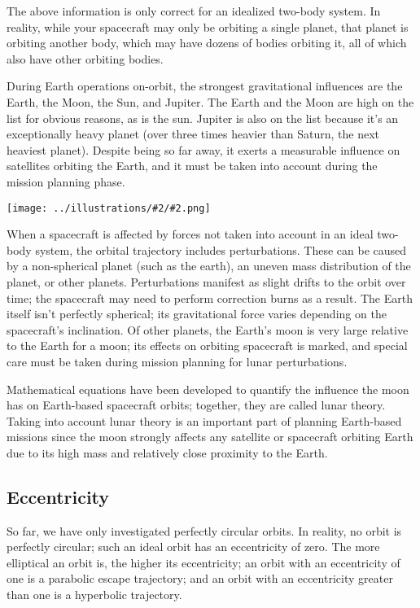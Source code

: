 \documentclass[oneside,a5paper]{book}
\newcommand{\widthillustration}[2]{{\centering\texttt{[image: ../illustrations/\#2/\#2.png]}}}
\newcommand{\illustration}[1]{\widthillustration{\linewidth}{#1}}
\begin{document}
The above information is only correct for an idealized two-body
system. In reality, while your spacecraft may only be orbiting a
single planet, that planet is orbiting another body, which may have
dozens of bodies orbiting it, all of which also have other orbiting
bodies.

During Earth operations on-orbit, the strongest gravitational
influences are the Earth, the Moon, the Sun, and Jupiter. The Earth
and the Moon are high on the list for obvious reasons, as is the
sun. Jupiter is also on the list because it’s an exceptionally heavy
planet (over three times heavier than Saturn, the next heaviest
planet). Despite being so far away, it exerts a measurable influence
on satellites orbiting the Earth, and it must be taken into account
during the mission planning phase.

\illustration{perturbations}

When a spacecraft is affected by forces not taken into account in an
ideal two-body system, the orbital trajectory includes
perturbations. These can be caused by a non-spherical planet (such as
the earth), an uneven mass distribution of the planet, or other
planets. Perturbations manifest as slight drifts to the orbit over
time; the spacecraft may need to perform correction burns as a
result. The Earth itself isn’t perfectly spherical; its gravitational
force varies depending on the spacecraft’s inclination. Of other
planets, the Earth’s moon is very large relative to the Earth for a
moon; its effects on orbiting spacecraft is marked, and special care
must be taken during mission planning for lunar perturbations.

Mathematical equations have been developed to quantify the influence
the moon has on Earth-based spacecraft orbits; together, they are
called lunar theory. Taking into account lunar theory is an important
part of planning Earth-based missions since the moon strongly affects
any satellite or spacecraft orbiting Earth due to its high mass and
relatively close proximity to the Earth.

\subsection{Eccentricity}

So far, we have only investigated perfectly circular orbits. In
reality, no orbit is perfectly circular; such an ideal orbit has an
eccentricity of zero. The more elliptical an orbit is, the higher its
eccentricity; an orbit with an eccentricity of one is a parabolic
escape trajectory; and an orbit with an eccentricity greater than one
is a hyperbolic trajectory.
\end{document}

